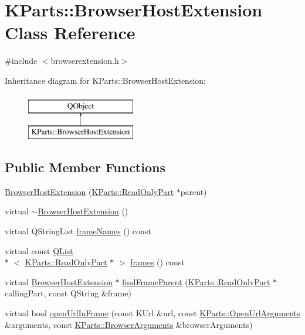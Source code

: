 \hypertarget{classKParts_1_1BrowserHostExtension}{\section{K\+Parts\+:\+:Browser\+Host\+Extension Class Reference}
\label{classKParts_1_1BrowserHostExtension}
}


{\ttfamily \#include $<$browserextension.\+h$>$}

Inheritance diagram for K\+Parts\+:\+:Browser\+Host\+Extension\+:\begin{figure}[H]
\begin{center}
\leavevmode
\includegraphics[height=2.000000cm]{classKParts_1_1BrowserHostExtension}
\end{center}
\end{figure}
\subsection*{Public Member Functions}
\begin{DoxyCompactItemize}
\item 
\hyperlink{classKParts_1_1BrowserHostExtension_af1c75309d63462007edd8536c0e57274}{Browser\+Host\+Extension} (\hyperlink{classKParts_1_1ReadOnlyPart}{K\+Parts\+::\+Read\+Only\+Part} $\ast$parent)
\item 
virtual \hyperlink{classKParts_1_1BrowserHostExtension_aa7202fb68e55dcf3556e0611c6b78263}{$\sim$\+Browser\+Host\+Extension} ()
\item 
virtual Q\+String\+List \hyperlink{classKParts_1_1BrowserHostExtension_a25ae4238d3c4f556ee9c7287c16c0f09}{frame\+Names} () const 
\item 
virtual const \hyperlink{classQList}{Q\+List}\\*
$<$ \hyperlink{classKParts_1_1ReadOnlyPart}{K\+Parts\+::\+Read\+Only\+Part} $\ast$ $>$ \hyperlink{classKParts_1_1BrowserHostExtension_a65a6429a794aa78ff5de27f973a43e86}{frames} () const 
\item 
virtual \hyperlink{classKParts_1_1BrowserHostExtension}{Browser\+Host\+Extension} $\ast$ \hyperlink{classKParts_1_1BrowserHostExtension_aa7d6192b9f6a399135f34d530d74a3e7}{find\+Frame\+Parent} (\hyperlink{classKParts_1_1ReadOnlyPart}{K\+Parts\+::\+Read\+Only\+Part} $\ast$calling\+Part, const Q\+String \&frame)
\item 
virtual bool \hyperlink{classKParts_1_1BrowserHostExtension_ae0227348d8b864d3093fb5dc6ca876f0}{open\+Url\+In\+Frame} (const K\+Url \&url, const \hyperlink{classKParts_1_1OpenUrlArguments}{K\+Parts\+::\+Open\+Url\+Arguments} \&arguments, const \hyperlink{structKParts_1_1BrowserArguments}{K\+Parts\+::\+Browser\+Arguments} \&browser\+Arguments)
\end{DoxyCompactItemize}
